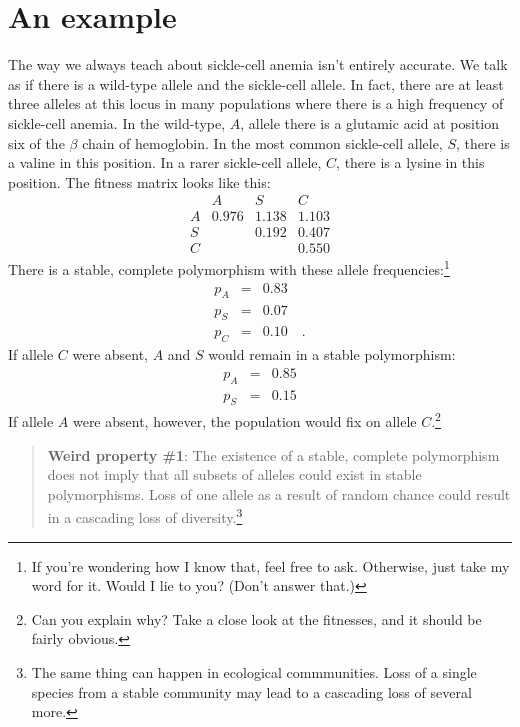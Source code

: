 \documentclass[12pt]{article}
\begin{document}
\section*{An example}

The way we always teach about sickle-cell anemia isn't entirely
accurate. We talk as if there is a wild-type allele and the
sickle-cell allele. In fact, there are at least three alleles at this
locus in many populations where there is a high frequency of
sickle-cell anemia. In the wild-type, $A$, allele there is a glutamic
acid at position six of the $\beta$ chain of hemoglobin. In the most
common sickle-cell allele, $S$, there is a valine in this position. In
a rarer sickle-cell allele, $C$, there is a lysine in this
position. The fitness matrix looks like this:
\[
\begin{array}{cccc}
  & A     & S     & C \\
A & 0.976 & 1.138 & 1.103 \\
S &       & 0.192 & 0.407 \\
C &       &       & 0.550
\end{array}
\]
There is a stable, complete polymorphism with these allele
frequencies:\footnote{If you're wondering how I know that, feel free
  to ask. Otherwise, just take my word for it. Would I lie to you?
  (Don't answer that.)}
\begin{eqnarray*}
p_A &=& 0.83 \\
p_S &=& 0.07 \\
p_C &=& 0.10 \quad .
\end{eqnarray*}
If allele $C$ were absent, $A$ and $S$ would remain in a stable
polymorphism:
\begin{eqnarray*}
p_A &=& 0.85 \\
p_S &=& 0.15
\end{eqnarray*}
If allele $A$ were absent, however, the population would fix on allele
$C$.\footnote{Can you explain why? Take a close look at the fitnesses,
  and it should be fairly obvious.}

\begin{quote} {\bf Weird property \#1}: The existence of a stable,
  complete polymorphism does not imply that all subsets of alleles
  could exist in stable polymorphisms. Loss of one allele as a result
  of random chance could result in a cascading loss of
  diversity.\footnote{The same thing can happen in ecological
    commmunities. Loss of a single species from a stable community may
    lead to a cascading loss of several more.}
\end{quote}
\end{document}
